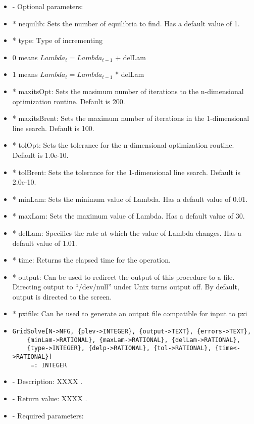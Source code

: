 \begin{itemize}
\item
- Optional parameters:

\bd
\item
*  nequilib:  Sets the number of equilibria to find.  Has a default 
value of 1.  
\item
*  type:   Type of incrementing 
	
\bd
\item
0 means $Lambda_t = Lambda_{t-1}$ + delLam
\item 
1 means $Lambda_t = Lambda_{t-1}$ * delLam
\ed

\item
*  maxitsOpt:  Sets the masimum number of iterations to the 
n-dimensional optimization routine.  Default is 200.
\item
*  maxitsBrent:  Sets the maximum number of iterations in
the 1-dimensional line search.  Default is 100.
\item
*  tolOpt:  Sets the tolerance for the n-dimensional
optimization routine.  Default is 1.0e-10.
\item
*  tolBrent:  Sets the tolerance for the 1-dimensional line
search.  Default is 2.0e-10.
\item
*  minLam:  Sets the minimum value of Lambda.  Has a default value of 0.01.
\item
*  maxLam:  Sets the maximum value of Lambda.  Has a default value of 30.
\item
*  delLam:  Specifies the rate at which the value of Lambda changes. Has a default value of 1.01.
\item
*  time:  Returns the elapsed time for the operation.
\item
*  output:  Can be used to redirect the output of this procedure to a
file.  Directing output to ``/dev/null'' under Unix turns output off.
By default, output is directed to the screen.
\item
*  pxifile: Can be used to generate an output file
compatible for input to pxi
\ed
\ed

\item
\begin{verbatim}
GridSolve[N->NFG, {plev->INTEGER}, {output->TEXT}, {errors->TEXT},
	{minLam->RATIONAL}, {maxLam->RATIONAL}, {delLam->RATIONAL}, 
	{type->INTEGER}, {delp->RATIONAL}, {tol->RATIONAL}, {time<->RATIONAL}]
	 =: INTEGER
\end{verbatim}

\bd
\item
- Description:  XXXX .
\item
- Return value:  XXXX .
\item
- Required parameters:
	

\end{itemize}
